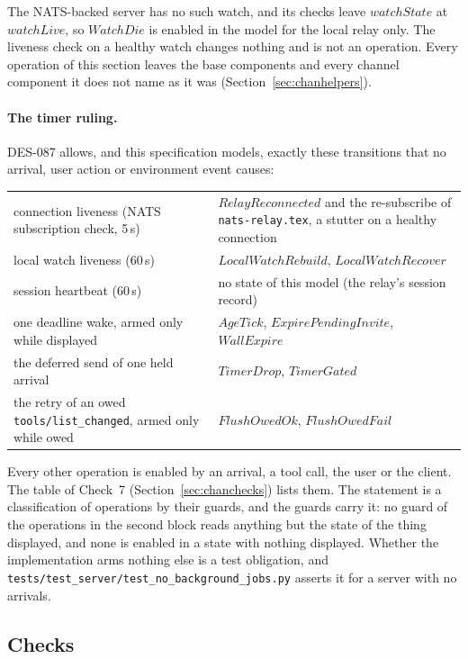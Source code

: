 \documentclass[a4paper,10pt,fleqn]{article}
\begin{document}
The NATS-backed server has no such watch, and its checks leave $watchState$
at $watchLive$, so $WatchDie$ is enabled in the model for the local relay only.
The liveness check on a healthy watch changes nothing and is not an operation.
Every operation of this section leaves the base components and every channel
component it does not name as it was (Section~\ref{sec:chanhelpers}).

\paragraph{The timer ruling.}  DES-087 allows, and this specification models,
exactly these transitions that no arrival, user action or environment event
causes:
\begin{center}
\begin{tabular}{ll}
  connection liveness (NATS subscription check, 5\,s) &
    $RelayReconnected$ and the re-subscribe of
    \texttt{nats-relay.tex}, a stutter on a healthy connection \\
  local watch liveness (60\,s) & $LocalWatchRebuild$, $LocalWatchRecover$ \\
  session heartbeat (60\,s) & no state of this model (the relay's session
    record) \\
  one deadline wake, armed only while displayed & $AgeTick$,
    $ExpirePendingInvite$, $WallExpire$ \\
  the deferred send of one held arrival & $TimerDrop$, $TimerGated$ \\
  the retry of an owed \texttt{tools/list\_changed}, armed only while owed &
    $FlushOwedOk$, $FlushOwedFail$ \\
\end{tabular}
\end{center}
Every other operation is enabled by an arrival, a tool call, the user or the
client.  The table of Check~7 (Section~\ref{sec:chanchecks}) lists them.  The
statement is a classification of operations by their guards, and the guards
carry it: no guard of the operations in the second block reads anything but
the state of the thing displayed, and none is enabled in a state with nothing
displayed.  Whether the implementation arms nothing else is a test
obligation, and \texttt{tests/test\_server/test\_no\_background\_jobs.py}
asserts it for a server with no arrivals.

\subsection{Checks}
\label{sec:timerchecks}
\end{document}
